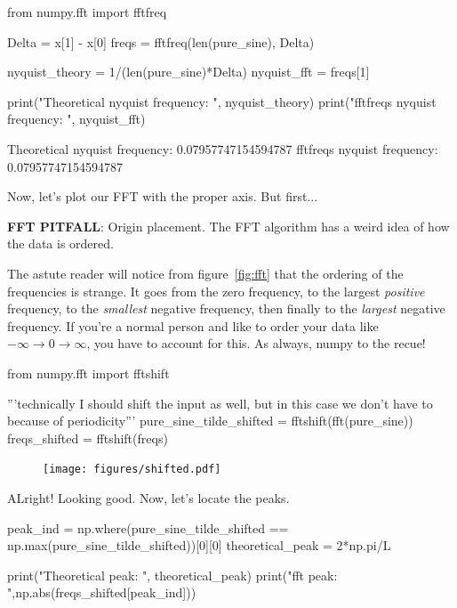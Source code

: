 \documentclass[a4paper]{article}
\newenvironment{colbox}[1]
  {\newcommand\colboxcolor{#1}%
   \begin{lrbox}{\selvestebox}%
   \begin{minipage}{\dimexpr\columnwidth-2\fboxsep\relax}}
  {\end{minipage}\end{lrbox}%
   \begin{center}
   \colorbox[HTML]{\colboxcolor}{\usebox{\selvestebox}}
   \end{center}}
\begin{document}
\begin{pyin}
from numpy.fft import fftfreq

Delta = x[1] - x[0]
freqs = fftfreq(len(pure_sine), Delta)

nyquist_theory = 1/(len(pure_sine)*Delta)
nyquist_fft = freqs[1]

print("Theoretical nyquist frequency: ", nyquist_theory)
print("fftfreqs nyquist frequency: ", nyquist_fft)
\end{pyin}
\vspace{1px}
\begin{pyprint}
Theoretical nyquist frequency:  0.07957747154594787
fftfreqs nyquist frequency:  0.07957747154594787
\end{pyprint}
Now, let's plot our FFT with the proper axis. But first... 


\begin{colbox}{F8E0E0}
    \textbf{FFT PITFALL}: Origin placement. The FFT algorithm has a weird idea of how the data is ordered. 
\end{colbox}

The astute reader will notice from figure~\ref{fig:fft} that the ordering of the frequencies is strange. It goes from the zero frequency, to the largest \textit{positive} frequency, to the \textit{smallest} negative frequency, then finally to the \textit{largest} negative frequency. If you're a normal person and like to order your data like $-\infty \rightarrow 0 \rightarrow \infty$, you have to account for this. As always, numpy to the recue! 
\vspace{1px}
\begin{pyin}
    from numpy.fft import fftshift 

'''technically I should shift the input as well, but in this case 
we don't have to because of periodicity'''
pure_sine_tilde_shifted = fftshift(fft(pure_sine))
freqs_shifted = fftshift(freqs)
\end{pyin}

\begin{figure}[H]
    \centering
    \texttt{[image: figures/shifted.pdf]}
\end{figure}

ALright! Looking good. Now, let's locate the peaks.
\\
\begin{pyin}
peak_ind = np.where(pure_sine_tilde_shifted == np.max(pure_sine_tilde_shifted))[0][0]
theoretical_peak = 2*np.pi/L

print("Theoretical peak: ", theoretical_peak)
print("fft peak: ",np.abs(freqs_shifted[peak_ind]))

\end{pyin}
\end{document}

